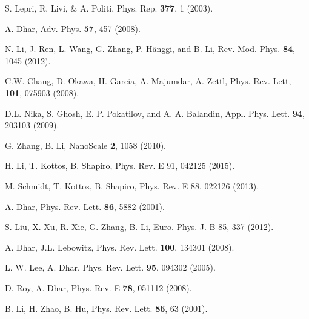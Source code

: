 \documentclass[onecolumn,fleqn,notitlepage,secnumarabic]{revtex4}
\begin{document}
\begin{thebibliography}{99}

S. Lepri, R. Livi, \& A. Politi, 
Phys. Rep. {\bf 377}, 1 (2003).

A. Dhar, 
Adv. Phys. {\bf 57}, 457 (2008).

N. Li, J. Ren, L. Wang, G. Zhang, P. H\"anggi, and B. Li, 
Rev. Mod. Phys. \textbf{84}, 1045 (2012).


C.W. Chang, D. Okawa, H. Garcia, A. Majumdar,  A. Zettl, 
Phys. Rev. Lett, {\bf 101}, 075903 (2008).

D.L. Nika, S. Ghosh, E. P. Pokatilov, and A. A. Balandin, 
Appl. Phys. Lett. {\bf 94}, 203103 (2009).


G. Zhang, B. Li,
NanoScale {\bf 2}, 1058 (2010).

H. Li, T. Kottos, B. Shapiro, 
Phys. Rev. E  91, 042125 (2015).

M. Schmidt, T. Kottos, B. Shapiro,
Phys. Rev. E  88, 022126 (2013).

A. Dhar, 
Phys. Rev. Lett. {\bf 86}, 5882 (2001).

S. Liu, X. Xu, R. Xie, G. Zhang, B. Li, 
Euro. Phys. J. B 85, 337 (2012).

A. Dhar, J.L. Lebowitz, 
Phys. Rev. Lett. {\bf 100}, 134301 (2008).

L. W. Lee, A. Dhar, 
Phys. Rev. Lett. {\bf 95}, 094302 (2005).

D. Roy, A. Dhar, 
Phys. Rev. E {\bf 78}, 051112 (2008).

B. Li, H. Zhao, B. Hu, 
Phys. Rev. Lett. {\bf 86}, 63 (2001).


\end{thebibliography}
\end{document}
